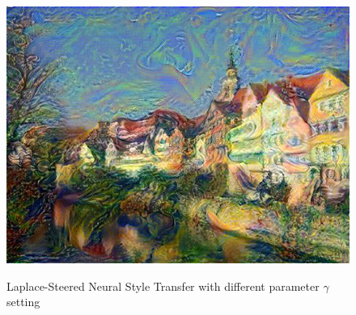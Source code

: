 \documentclass[runningheads]{llncs}
\begin{document}
\begin{figure}[h!]
{\begin{minipage}[b]{0.15\textwidth}
\includegraphics[width=1.1\textwidth]{neural_style_transfer/img/TV_laplacian/original_output_lap-150.jpg} \\
\end{minipage}
}
\caption{Laplace-Steered Neural Style Transfer with different parameter $\gamma$ setting}
\label{lap_gamma}
\end{figure}
\end{document}

